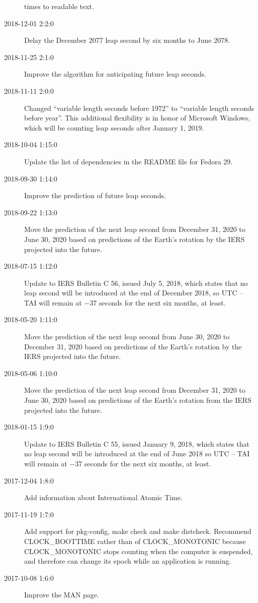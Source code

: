 \documentclass[letterpaper,twoside]{article}
\begin{document}
\begin{description}
  times to readable text.
\item[2018-12-01 2:2:0] Delay the December 2077 leap second by
  six months to June 2078.
\item[2018-11-25 2:1:0] Improve the algorithm for anticipating future
  leap seconds.
\item[2018-11-11 2:0:0] Changed ``variable length seconds before 1972''
  to ``variable length seconds before year''.  This additional flexibility
  is in honor of Microsoft Windows, which will be counting leap seconds
  after January 1, 2019.
\item[2018-10-04 1:15:0] Update the list of dependencies in the
  README file for Fedora 29.
\item[2018-09-30 1:14:0] Improve the prediction of future leap seconds.
\item[2018-09-22 1:13:0] Move the prediction of the next leap second
  from December 31, 2020 to June 30, 2020 based on predictions of
  the Earth's rotation by the IERS projected into the future.
\item[2018-07-15 1:12:0] Update to IERS Bulletin C 56, issued July
  5, 2018, which states that no leap second will be introduced
  at the end of December 2018, so UTC -- TAI will remain at
  \num{-37} seconds for the next six months, at least.
\item[2018-05-20 1:11:0] Move the prediction of the next leap second
  from June 30, 2020 to December 31, 2020 based on predictions of
  the Earth's rotation by the IERS projected into the future.
\item[2018-05-06 1:10:0] Move the prediction of the next leap second
  from December 31, 2020 to June 30, 2020 based on predictions
  of the Earth's rotation from the IERS projected into the future.
\item[2018-01-15 1:9:0] Update to IERS Bulletin C 55, issued
  January 9, 2018, which states that no leap second will be introduced
  at the end of June 2018 so UTC -- TAI will remain at \num{-37} seconds
  for the next six months, at least.
\item[2017-12-04 1:8:0] Add information about International Atomic Time.
\item[2017-11-19 1:7:0] Add support for pkg-config, make check and
  make distcheck.  Recommend CLOCK\_BOOTTIME rather than of CLOCK\_MONOTONIC
  because CLOCK\_MONOTONIC stops counting when the computer is suspended,
  and therefore can change its epoch while an application is running.
\item[2017-10-08 1:6:0] Improve the MAN page.

\end{description}
\end{document}
